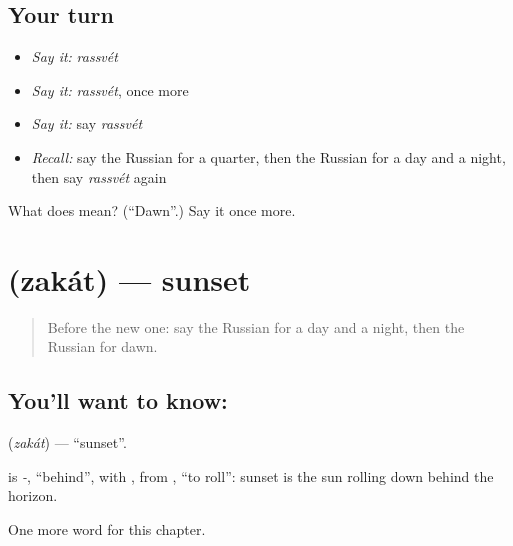\subsection*{Your turn}
\begin{itemize}
\raggedright
  \item \emph{Say it:} \emph{rassvét}
  \item \emph{Say it:} \emph{rassvét}, once more
  \item \emph{Say it:} say \emph{rassvét}
  \item \emph{Recall:} say the Russian for a quarter, then the Russian for a day and a night, then say \emph{rassvét} again
\end{itemize}

\begin{tcolorbox}[breakable,colback=teal!4,colframe=teal!35!black,title={Before you move on}]
What does  mean? (\textquotedblleft{}Dawn\textquotedblright{}.) Say it once more.
\end{tcolorbox}
\section[\texorpdfstring{\ru{закат} (zakát)}{закат (zakát)}]{ (zakát) — sunset}

\label{lesson:RU-C149-zakat}



\begin{quote}
Before the new one: say the Russian for a day and a night, then the Russian for dawn.
\end{quote}

\subsection*{You'll want to know: }
\textbf{} (\emph{zakát}) — \textquotedblleft{}sunset\textquotedblright{}.

\begin{cousinweb}
\textbf{} is \emph{-}, \textquotedblleft{}behind\textquotedblright{}, with \emph{}, from \emph{}, \textquotedblleft{}to roll\textquotedblright{}: sunset is the sun rolling down behind the horizon.
\end{cousinweb}

\begin{grammarlens}[title={What you've built}]
One more word for this chapter.
\end{grammarlens}

